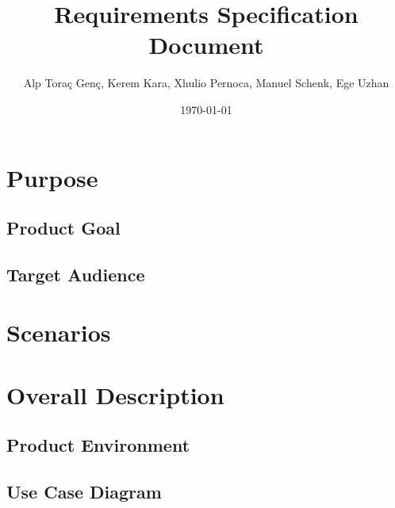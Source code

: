 \documentclass[10pt,a4paper]{report}
\title{Requirements Specification Document}
\author{Alp Toraç Genç, Kerem Kara, Xhulio Pernoca, Manuel Schenk, Ege Uzhan}
\date{\today}
\begin{document}
\maketitle
\tableofcontents

\chapter{Purpose}
\section{Product Goal}
\section{Target Audience}

\chapter{Scenarios}

\chapter{Overall Description}
\section{Product Environment}
\section{Use Case Diagram}
\section{System Model}

\chapter{Stored Data}

\chapter{Specific Requirements}
\section{Requirements Overview}
\subsection{Mandatory Requirements}
\end{document}
